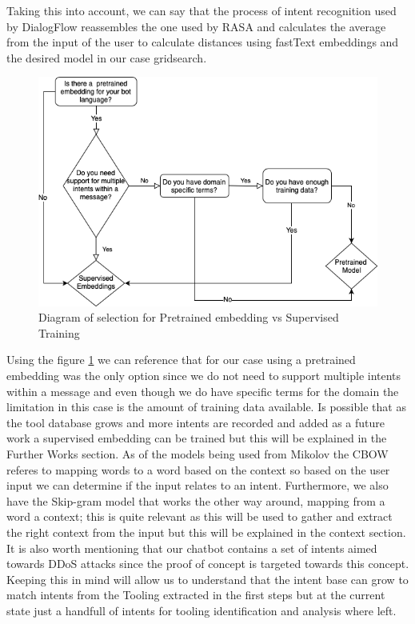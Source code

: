 Taking this into account, we can say that the process of intent recognition used by DialogFlow reassembles the one used by RASA and calculates the average from the input of the user to calculate distances using fastText embeddings and the desired model in our case gridsearch.

\begin{figure}[!ht]
    \centering
    \includegraphics[scale=0.70]{MA-BA-Thesis/IntentDiagram.png}
    \caption{Diagram of selection for Pretrained embedding vs Supervised Training}
    \label{fig:diagramIntent}
\end{figure}

Using the figure \ref{fig:diagramIntent} we can reference that for our case using a pretrained embedding was the only option since we do not need to support multiple intents within a message and even though we do have specific terms for the domain the limitation in this case is the amount of training data available. Is possible that as the tool database grows and more intents are recorded and added as a future work a supervised embedding can be trained but this will be explained in the Further Works section. As of the models being used from Mikolov the CBOW referes to mapping words to a word based on the context so based on the user input we can determine if the input relates to an intent. Furthermore, we also have the Skip-gram model that works the other way around, mapping from a word a context; this is quite relevant as this will be used to gather and extract the right context from the input but this will be explained in the context section. It is also worth mentioning that our chatbot contains a set of intents aimed towards DDoS attacks since the proof of concept is targeted towards this concept. Keeping this in mind will allow us to understand that the intent base can grow to match intents from the Tooling extracted in the first steps but at the current state just a handfull of intents for tooling identification and analysis where left.

